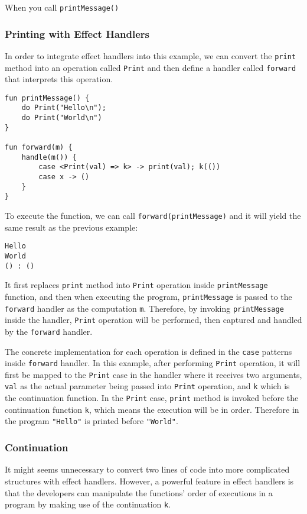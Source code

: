 \documentclass[logo,bsc,singlespacing,parskip]{infthesis}
\begin{document}
When you call \texttt{printMessage()}

\subsubsection{Printing with Effect Handlers}
In order to integrate effect handlers into this example, we can convert the \texttt{print} method into an operation called \texttt{Print} and then define a handler called \texttt{forward} that interprets this operation.
\begin{verbatim}
fun printMessage() {
    do Print("Hello\n");
    do Print("World\n")
}

fun forward(m) {
    handle(m()) {
        case <Print(val) => k> -> print(val); k(())
        case x -> ()
    }
}
\end{verbatim}
To execute the function, we can call \texttt{forward(printMessage)} and it will yield the same result as the previous example:
\begin{verbatim}
Hello
World
() : ()
\end{verbatim}

It first replaces \texttt{print} method into \texttt{Print} operation inside \texttt{printMessage} function, and then when executing the program, \texttt{printMessage} is passed to the \texttt{forward} handler as the computation \texttt{m}. Therefore, by invoking \texttt{printMessage} inside the handler, \texttt{Print} operation will be performed, then captured and handled by the \texttt{forward} handler.

The concrete implementation for each operation is defined in the \texttt{case} patterns inside \texttt{forward} handler. In this example, after performing \texttt{Print} operation, it will first be mapped to the \texttt{Print} case in the handler where it receives two arguments, \texttt{val} as the actual parameter being passed into \texttt{Print} operation, and \texttt{k} which is the continuation function. In the \texttt{Print} case, \texttt{print} method is invoked before the continuation function \texttt{k}, which means the execution will be in order. Therefore in the program \texttt{"Hello"} is printed before \texttt{"World"}.

\subsubsection{Continuation}
It might seems unnecessary to convert two lines of code into more complicated structures with effect handlers. However, a powerful feature in effect handlers is that the developers can manipulate the functions' order of executions in a program by making use of the continuation \texttt{k}. 
\end{document}
